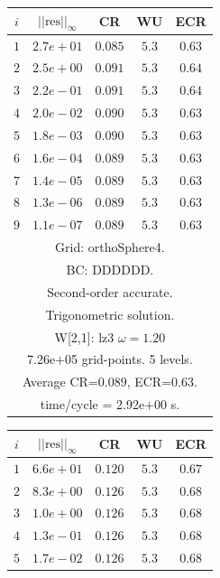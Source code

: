 \begin{table}[hbt]
\begin{center}
{\tablefontsize
\begin{tabular}{|c|c|c|c|c|} \hline 
 $i$   & $\vert\vert\mbox{res}\vert\vert_\infty$  &  CR     &  WU    & ECR  \\   \hline 
 $ 1$  & $ 2.7e+01$ & $0.085$ & $ 5.3$ & $0.63$ \\ 
 $ 2$  & $ 2.5e+00$ & $0.091$ & $ 5.3$ & $0.64$ \\ 
 $ 3$  & $ 2.2e-01$ & $0.091$ & $ 5.3$ & $0.64$ \\ 
 $ 4$  & $ 2.0e-02$ & $0.090$ & $ 5.3$ & $0.63$ \\ 
 $ 5$  & $ 1.8e-03$ & $0.090$ & $ 5.3$ & $0.63$ \\ 
 $ 6$  & $ 1.6e-04$ & $0.089$ & $ 5.3$ & $0.63$ \\ 
 $ 7$  & $ 1.4e-05$ & $0.089$ & $ 5.3$ & $0.63$ \\ 
 $ 8$  & $ 1.3e-06$ & $0.089$ & $ 5.3$ & $0.63$ \\ 
 $ 9$  & $ 1.1e-07$ & $0.089$ & $ 5.3$ & $0.63$ \\ 
\hline 
\multicolumn{5}{|c|}{Grid: orthoSphere4.}  \\
\multicolumn{5}{|c|}{BC: DDDDDD.}  \\
\multicolumn{5}{|c|}{Second-order accurate.}  \\
\multicolumn{5}{|c|}{Trigonometric solution.}  \\
\multicolumn{5}{|c|}{W[2,1]: lz3 $\omega=1.20$}  \\
\multicolumn{5}{|c|}{7.26e+05 grid-points. 5 levels.}  \\
\multicolumn{5}{|c|}{Average CR=$0.089$, ECR=$0.63$.}  \\
\multicolumn{5}{|c|}{time/cycle = 2.92e+00 s.}  \\
\hline 
\end{tabular}
\begin{tabular}{|c|c|c|c|c|} \hline 
 $i$   & $\vert\vert\mbox{res}\vert\vert_\infty$  &  CR     &  WU    & ECR  \\   \hline 
 $ 1$  & $ 6.6e+01$ & $0.120$ & $ 5.3$ & $0.67$ \\ 
 $ 2$  & $ 8.3e+00$ & $0.126$ & $ 5.3$ & $0.68$ \\ 
 $ 3$  & $ 1.0e+00$ & $0.126$ & $ 5.3$ & $0.68$ \\ 
 $ 4$  & $ 1.3e-01$ & $0.126$ & $ 5.3$ & $0.68$ \\ 
 $ 5$  & $ 1.7e-02$ & $0.126$ & $ 5.3$ & $0.68$ \\ 

\end{tabular}}
\end{center}
\end{table}
